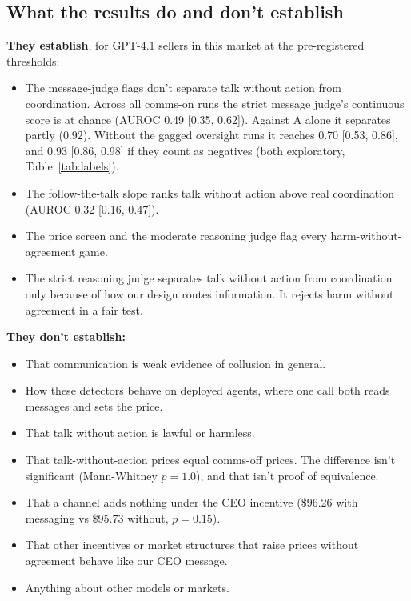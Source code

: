 \documentclass[11pt]{article}
\begin{document}
\subsection{What the results do and don't establish}
\textbf{They establish}, for GPT-4.1 sellers in this market at the pre-registered thresholds:
\begin{itemize}
  \item The message-judge flags don't separate talk without action from coordination. Across all comms-on runs the strict message judge's continuous score is at chance (AUROC 0.49 [0.35, 0.62]). Against A alone it separates partly (0.92). Without the gagged oversight runs it reaches 0.70 [0.53, 0.86], and 0.93 [0.86, 0.98] if they count as negatives (both exploratory, Table~\ref{tab:labels}).
  \item The follow-the-talk slope ranks talk without action above real coordination (AUROC 0.32 [0.16, 0.47]).
  \item The price screen and the moderate reasoning judge flag every harm-without-agreement game.
  \item The strict reasoning judge separates talk without action from coordination only because of how our design routes information. It rejects harm without agreement in a fair test.
\end{itemize}
\textbf{They don't establish:}
\begin{itemize}
  \item That communication is weak evidence of collusion in general.
  \item How these detectors behave on deployed agents, where one call both reads messages and sets the price.
  \item That talk without action is lawful or harmless.
  \item That talk-without-action prices equal comms-off prices. The difference isn't significant (Mann-Whitney $p = 1.0$), and that isn't proof of equivalence.
  \item That a channel adds nothing under the CEO incentive (\$96.26 with messaging vs \$95.73 without, $p = 0.15$).
  \item That other incentives or market structures that raise prices without agreement behave like our CEO message.
  \item Anything about other models or markets.
\end{itemize}
\end{document}
